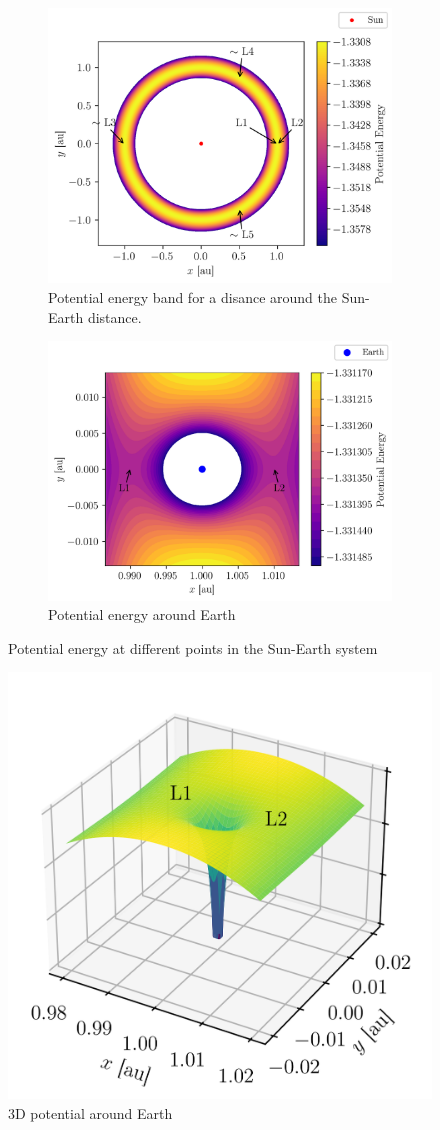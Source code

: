 \begin{figure}[h]
    \centering
    \begin{subfigure}{0.48\linewidth}
        \includegraphics[width=0.6\linewidth]{figures/potential_global.png}
        \caption{Potential energy band for a disance around the Sun-Earth distance.}
        \label{fig:lagrange_potential_global}
    \end{subfigure}
    \begin{subfigure}{0.48\linewidth}
        \includegraphics[width=0.6\linewidth]{figures/potential_L1_L2_zoom.png}
        \caption{Potential energy around Earth}
        \label{fig:lagrange_L1_L2}
    \end{subfigure}
    \caption{Potential energy at different points in the Sun-Earth system}
\end{figure}

\begin{figure}[h]
    \centering
    \includegraphics[width=0.6\linewidth]{figures/potential3D_L1_L2_zoom.png}
    \caption{3D potential around Earth}
    \label{fig:lagrange_potential_3D}
\end{figure}